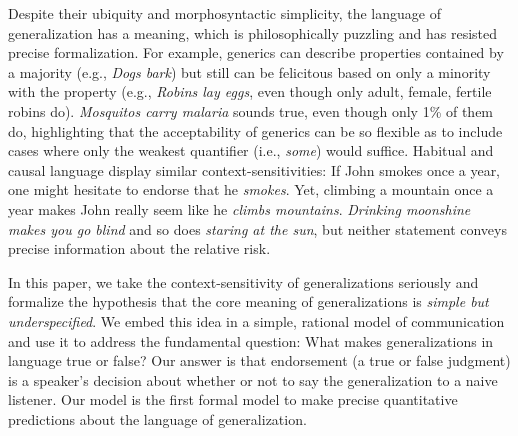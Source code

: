 \documentclass[11pt,letterpaper]{letter} %
\begin{document}
\begin{letter}
Despite their ubiquity and morphosyntactic simplicity, the language of generalization has a meaning, which is philosophically puzzling and has resisted precise formalization. 
For example, generics can describe properties contained by a majority (e.g., \emph{Dogs bark}) but still can be felicitous based on only a minority with the property (e.g., \emph{Robins lay eggs}, even though only adult, female, fertile robins do). 
\emph{Mosquitos carry malaria} sounds true, even though only 1\% of them do, highlighting that the acceptability of generics can be so flexible as to include cases where only the weakest quantifier (i.e., \emph{some}) would suffice. 
Habitual and causal language display similar context-sensitivities:
If John smokes once a year, one might hesitate to endorse that he \emph{smokes}.
Yet, climbing a mountain once a year makes John really seem like he \emph{climbs mountains}.
\emph{Drinking moonshine makes you go blind} and so does \emph{staring at the sun}, but neither statement conveys precise information about the relative risk.


In this paper, we take the context-sensitivity of generalizations seriously and formalize the hypothesis that the core meaning of generalizations is \emph{simple but underspecified}. 
We embed this idea in a simple, rational model of communication and use it to address the fundamental question: What makes generalizations in language true or false?
Our answer is that endorsement (a true or false judgment) is a speaker's decision about whether or not to say the generalization to a naive listener.
Our model is the first formal model to make precise quantitative predictions about the language of generalization.


\end{letter}
\end{document}
